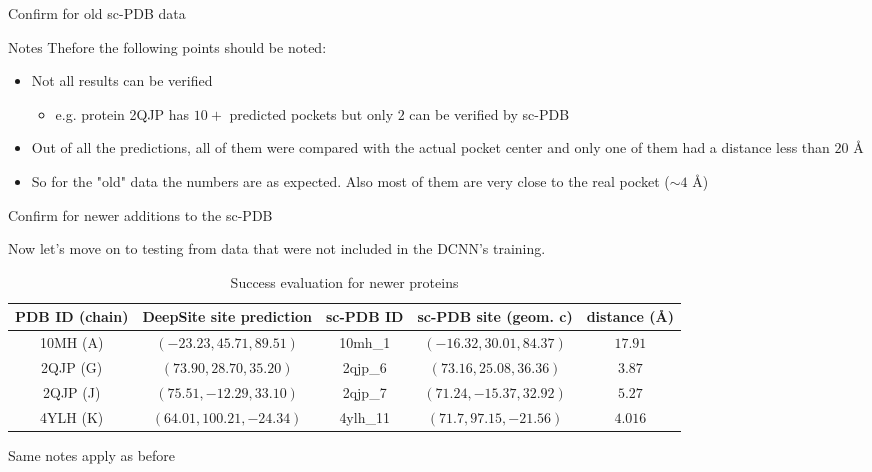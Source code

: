 \documentclass{beamer}
\begin{document}
\begin{frame}{Confirm for old sc-PDB data}
  \begin{block}{Notes}
    Thefore the following points should be noted:
    \begin{itemize}
      \item Not all results can be verified
      \begin{itemize}
        \item e.g. protein 2QJP has $10+$ predicted pockets but only $2$ can be verified by sc-PDB
      \end{itemize}
      \item Out of all the predictions, all of them were compared with the actual pocket center and only one of them had a distance less than $20$ \AA
      \item So for the "old" data the numbers are as expected.
      Also most of them are very close to the real pocket ($\sim 4$ \AA)
    \end{itemize}
  \end{block}
\end{frame}

\begin{frame}{Confirm for newer additions to the sc-PDB}
  \begin{block}{}
    Now let's move on to testing from data that were not included in the DCNN's training.
  \end{block}
  \begin{tiny}
  \begin{table}
  \caption{Success evaluation for newer proteins}
  \label{table:4}
  \begin{tabular}{ c | c | c | c | c }
    PDB ID (chain) & DeepSite site prediction & sc-PDB ID & sc-PDB site (geom. c) & distance (\AA) \\
    \hline
    10MH (A) & $(-23.23, 45.71, 89.51)$ & 10mh\_1 & $(-16.32, 30.01, 84.37)$ & $17.91$ \\
    2QJP (G) & $(73.90, 28.70, 35.20)$ & 2qjp\_6 & $(73.16, 25.08, 36.36)$ & $3.87$ \\
    2QJP (J) & $(75.51, -12.29, 33.10)$ & 2qjp\_7 & $(71.24, -15.37, 32.92)$ & $5.27$ \\
    4YLH (K) & $(64.01, 100.21, -24.34)$ & 4ylh\_11 & $(71.7, 97.15, -21.56)$ & $4.016$
  \end{tabular}
  \end{table}
  \end{tiny}
  Same notes apply as before
\end{frame}
\end{document}
